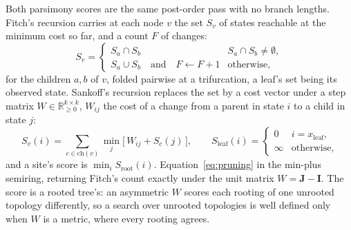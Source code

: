 \documentclass[11pt,a4paper]{article}
\begin{document}
Both parsimony scores are the same post-order pass with no branch lengths.
Fitch's recursion \citep{fitch1971} carries at each node $v$ the set $S_v$
of states reachable at the minimum cost so far, and a count $F$ of changes:
\begin{equation}
  S_v = \begin{cases}
    S_a \cap S_b & S_a \cap S_b \neq \emptyset, \\
    S_a \cup S_b \quad\text{and}\quad F \leftarrow F + 1 & \text{otherwise},
  \end{cases}
  \label{eq:fitch}
\end{equation}
for the children $a, b$ of $v$, folded pairwise at a trifurcation, a leaf's
set being its observed state. Sankoff's recursion \citep{sankoff1975}
replaces the set by a cost vector under a step matrix $W \in
\mathbb{R}_{\ge 0}^{k \times k}$, $W_{ij}$ the cost of a change from a
parent in state $i$ to a child in state $j$:
\begin{equation}
  S_v(i) = \sum_{c \in \mathrm{ch}(v)} \min_j \big[\, W_{ij} + S_c(j) \,\big],
  \qquad
  S_{\mathrm{leaf}}(i) = \begin{cases} 0 & i = x_{\mathrm{leaf}}, \\
    \infty & \text{otherwise}, \end{cases}
  \label{eq:sankoff}
\end{equation}
and a site's score is $\min_i S_{\mathrm{root}}(i)$.
Equation~\ref{eq:pruning} in the min-plus semiring, returning Fitch's count
exactly under the unit matrix $W = \mathbf{J} - \mathbf{I}$. The score is a
rooted tree's: an asymmetric $W$ scores each rooting of one unrooted topology
differently, so a search over unrooted topologies is well defined only when
$W$ is a metric, where every rooting agrees.
\end{document}
